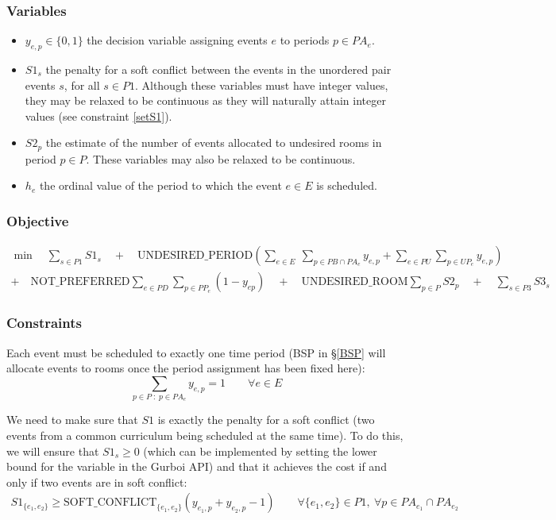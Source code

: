 \documentclass{article}
\theoremstyle{plain}
\numberwithin{theorem}{section}
\numberwithin{example}{section}
\theoremstyle{definition}
\begin{document}
\subsubsection*{Variables}
\begin{itemize}
    \item $y_{e, p} \in \{0,1\}$ the decision variable assigning events $e$ to
        periods $p \in PA_e$.
    \item $S1_s$ the penalty for a soft conflict between the events in the
        unordered pair events $s$, for all $s \in P1$. Although these variables
        must have integer values, they may be relaxed to be continuous as they
        will naturally attain integer values (see constraint \eqref{setS1}).
    \item $S2_p$ the estimate of the number of events allocated to undesired
        rooms in period $p \in P$. These variables may also be relaxed to be
        continuous.
    \item $h_e$ the ordinal value of the period to which the event $e \in E$ is
        scheduled.
\end{itemize}

\subsubsection*{Objective}
\begin{multline}
    \min \quad \sum_{s \in P1} S1_s \quad + \quad \text{UNDESIRED\_PERIOD}
        \left( \sum_{e \in E} \ \sum_{p \in PB \cap PA_e} y_{e, p} +
        \sum_{e \in PU} \sum_{p \in UP_e} y_{e, p} \right) \\
    + \quad \text{NOT\_PREFERRED} \sum_{e \in PD} \sum_{p \in PP_e} (1 - y_{ep})
        \quad + \quad \text{UNDESIRED\_ROOM} \sum_{p \in P} S2_p \quad + \quad
        \sum_{s \in P3} S3_s
\end{multline}

\subsubsection*{Constraints}
Each event must be scheduled to exactly one time period (BSP in \S\ref{BSP} will
allocate events to rooms once the period assignment has been fixed here):
\begin{equation}
    \sum_{p \in P \; : \; p \in PA_e} y_{e,p} = 1 \qquad \forall e \in E
\end{equation}

We need to make sure that $S1$ is exactly the penalty for a soft conflict (two
events from a common curriculum being scheduled at the same time). To do this,
we will ensure that $S1_s \geq 0$ (which can be implemented by setting the lower
bound for the variable in the Gurboi API) and that it achieves the cost if and
only if two events are in soft conflict:
\begin{gather} \label{setS1}
    S1_{\{e_1, e_2\}} \geq \text{SOFT\_CONFLICT}_{\{e_1, e_2\}}
        (y_{e_1, p} + y_{e_2, p} - 1) \qquad \forall \{e_1, e_2\} \in P1, \
        \forall p \in PA_{e_1} \cap PA_{e_2}
\end{gather}
\end{document}
